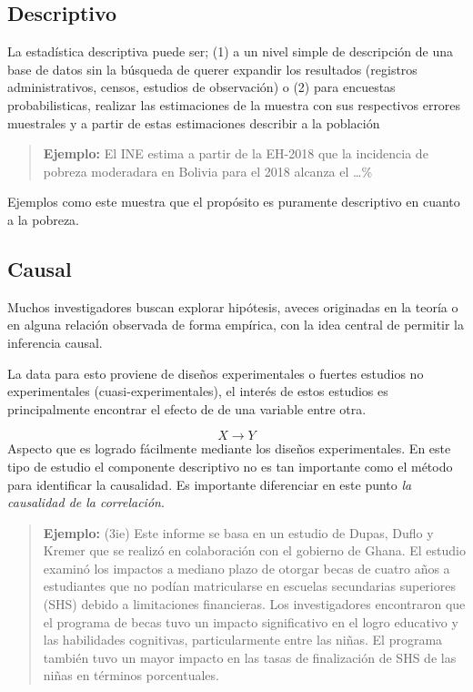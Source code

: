 \documentclass[
]{book}
\begin{document}
\hypertarget{descriptivo}{%
\subsection{Descriptivo}\label{descriptivo}}

La estadística descriptiva puede ser; (1) a un nivel simple de descripción de una base de datos sin la búsqueda de querer expandir los resultados (registros administrativos, censos, estudios de observación) o (2) para encuestas probabilisticas, realizar las estimaciones de la muestra con sus respectivos errores muestrales y a partir de estas estimaciones describir a la población

\begin{quote}
\textbf{Ejemplo:} El INE estima a partir de la EH-2018 que la incidencia de pobreza moderadara en Bolivia para el 2018 alcanza el \ldots\%
\end{quote}

Ejemplos como este muestra que el propósito es puramente descriptivo en cuanto a la pobreza.

\hypertarget{causal}{%
\subsection{Causal}\label{causal}}

Muchos investigadores buscan explorar hipótesis, aveces originadas en la teoría o en alguna relación observada de forma empírica, con la idea central de permitir la inferencia causal.

La data para esto proviene de diseños experimentales o fuertes estudios no experimentales (cuasi-experimentales), el interés de estos estudios es principalmente encontrar el efecto de de una variable entre otra.

\[X \rightarrow Y\]
Aspecto que es logrado fácilmente mediante los diseños experimentales. En este tipo de estudio el componente descriptivo no es tan importante como el método para identificar la causalidad. Es importante diferenciar en este punto \emph{la causalidad de la correlación}.

\begin{quote}
\textbf{Ejemplo:} (3ie) Este informe se basa en un estudio de Dupas, Duflo y Kremer que se realizó en colaboración con el gobierno de Ghana. El estudio examinó los impactos a mediano plazo de otorgar becas de cuatro años a estudiantes que no podían matricularse en escuelas secundarias superiores (SHS) debido a limitaciones financieras. Los investigadores encontraron que el programa de becas tuvo un impacto significativo en el logro educativo y las habilidades cognitivas, particularmente entre las niñas. El programa también tuvo un mayor impacto en las tasas de finalización de SHS de las niñas en términos porcentuales.
\end{quote}
\end{document}

